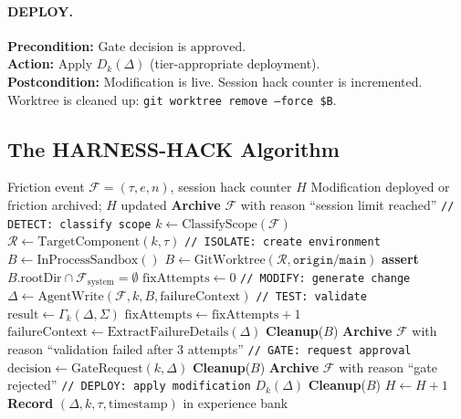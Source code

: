 \paragraph{DEPLOY.}
\textbf{Precondition:} Gate decision is $\text{approved}$. \\
\textbf{Action:} Apply $D_k(\Delta)$ (tier-appropriate deployment). \\
\textbf{Postcondition:} Modification is live. Session hack counter is
incremented. Worktree is cleaned up: \texttt{git worktree remove --force \$B}.

\subsection{The HARNESS-HACK Algorithm}
\label{sec:algorithm}

\begin{algorithm}[H]
\caption{HARNESS-HACK: Safe Agent Self-Modification}
\label{alg:hhp}
\begin{algorithmic}[1]
\Require Friction event $\mathcal{F} = (\tau, e, n)$, session hack counter $H$
\Ensure Modification deployed or friction archived; $H$ updated
    \State \textbf{Archive} $\mathcal{F}$ with reason ``session limit reached''
    \State \Return {}
\EndIf
\State \texttt{// DETECT: classify scope}
\State $k \gets \text{ClassifyScope}(\mathcal{F})$ 
\State $\mathcal{R} \gets \text{TargetComponent}(k, \tau)$
\State \texttt{// ISOLATE: create environment}
    \State $B \gets \text{InProcessSandbox}()$
\Else
    \State $B \gets \text{GitWorktree}(\mathcal{R}, \texttt{origin/main})$
    \State \textbf{assert} $B.\text{rootDir} \cap \mathcal{F}_{\text{system}} = \emptyset$
\EndIf
\State $\text{fixAttempts} \gets 0$
\Repeat {}
    \State \texttt{// MODIFY: generate change}
    \State $\Delta \gets \text{AgentWrite}(\mathcal{F}, k, B, \text{failureContext})$
    \State \texttt{// TEST: validate}
    \State $\text{result} \gets \Gamma_k(\Delta, \Sigma)$
    \State $\text{fixAttempts} \gets \text{fixAttempts} + 1$
        \State $\text{failureContext} \gets \text{ExtractFailureDetails}(\Delta)$
    \EndIf
{}
    \State \textbf{Cleanup}($B$) 
    \State \textbf{Archive} $\mathcal{F}$ with reason ``validation failed after 3 attempts''
    \State \Return
\EndIf
\State \texttt{// GATE: request approval}
\State $\text{decision} \gets \text{GateRequest}(k, \Delta)$
    \State \textbf{Cleanup}($B$)
    \State \textbf{Archive} $\mathcal{F}$ with reason ``gate rejected''
    \State \Return
\EndIf
\State \texttt{// DEPLOY: apply modification}
\State $D_k(\Delta)$ 
\State \textbf{Cleanup}($B$) 
\State $H \gets H + 1$
\State \textbf{Record} $(\Delta, k, \tau, \text{timestamp})$ in experience bank
\end{algorithmic}
\end{algorithm}

